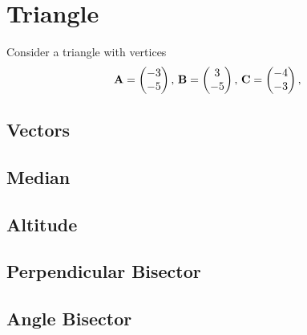 \documentclass[11pt]{book}
\begin{document}
\frontmatter
\tableofcontents
\setcounter{page}{1}
\mainmatter
\chapter{Triangle}
Consider a triangle with vertices
\begin{align}
\label{eq:tri-pts}
\vec{A}=\myvec{-3 \\ -5},\,
\vec{B}=\myvec{3\\-5},\,
	\vec{C}=\myvec{-4\\-3},\,
\end{align}

\section{Vectors}
\section{Median}
\section{Altitude}
\section{Perpendicular Bisector}
\section{Angle Bisector}
\end{document}
